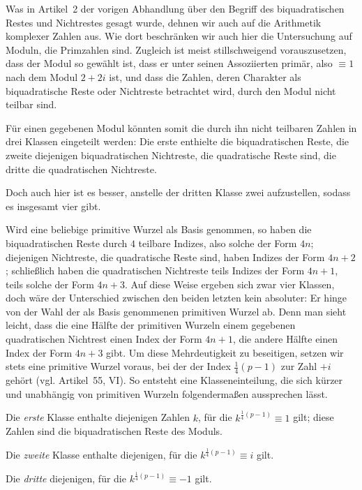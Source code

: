 \newpage
{}
Was in Artikel~2 der vorigen Abhandlung über den Begriff des biquadratischen Restes und Nichtrestes gesagt wurde, dehnen wir auch auf die Arithmetik komplexer Zahlen aus. Wie dort beschränken wir auch hier die Untersuchung auf Moduln, die Primzahlen sind. Zugleich ist meist stillschweigend vorauszusetzen, dass der Modul so gewählt ist, dass er unter seinen Assoziierten primär, also $\equiv1$ nach dem Modul $2+2i$ ist, und dass die Zahlen, deren Charakter als biquadratische Reste oder Nichtreste betrachtet wird, durch den Modul nicht teilbar sind.

Für einen gegebenen Modul könnten somit die durch ihn nicht teilbaren Zahlen in drei Klassen eingeteilt werden: Die erste enthielte die biquadratischen Reste, die zweite diejenigen biquadratischen Nichtreste, die quadratische Reste sind, die dritte die quadratischen Nichtreste.

%
Doch auch hier ist es besser, anstelle der dritten Klasse zwei aufzustellen, sodass es insgesamt vier gibt.

Wird eine beliebige primitive Wurzel als Basis genommen, so haben die biquadratischen Reste durch $4$ teilbare Indizes, also solche der Form $4n$; diejenigen Nichtreste, die quadratische Reste sind, haben Indizes der Form $4n+2$; schließlich haben die quadratischen Nichtreste teils Indizes der Form $4n+1$, teils solche der Form $4n+3$. Auf diese Weise ergeben sich zwar vier Klassen, doch wäre der Unterschied zwischen den beiden letzten kein absoluter: Er hinge von der Wahl der als Basis genommenen primitiven Wurzel ab. Denn man sieht leicht, dass die eine Hälfte der primitiven Wurzeln einem gegebenen quadratischen Nichtrest einen Index der Form $4n+1$, die andere Hälfte einen Index der Form $4n+3$ gibt. Um diese Mehrdeutigkeit zu beseitigen, setzen wir stets eine primitive Wurzel voraus, bei der der Index $\frac14(p-1)$ zur Zahl $+i$ gehört (vgl. Artikel~55, VI). So entsteht eine Klasseneinteilung, die sich kürzer und unabhängig von primitiven Wurzeln folgendermaßen aussprechen lässt.

Die \emph{erste} Klasse enthalte diejenigen Zahlen $k$, für die $k^{\frac14(p-1)}\equiv1$ gilt; diese Zahlen sind die biquadratischen Reste des Moduls.

Die \emph{zweite} Klasse enthalte diejenigen, für die $k^{\frac14(p-1)}\equiv i$ gilt.

Die \emph{dritte} diejenigen, für die $k^{\frac14(p-1)}\equiv-1$ gilt.

